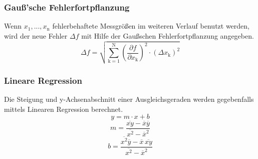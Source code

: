 \subsubsection{Gauß'sche Fehlerfortpflanzung}
Wenn $x_\text{1}, ..., x_\text{n}$ fehlerbehaftete Messgrößen im weiteren Verlauf benutzt werden, wird der neue Fehler $\Delta f$ mit Hilfe der Gaußschen Fehlerfortpflanzung angegeben.
\begin{equation}
	\Delta f = \sqrt{\sum_{\text{k}=1}^\text{N} \left( \frac{ \partial f}{\partial x_\text{k}} \right) ^2 \cdot (\Delta x_\text{k})^2}
\end{equation}

\subsubsection{Lineare Regression}
Die Steigung und y-Achsenabschnitt einer Ausgleichsgeraden werden gegebenfalls mittels Linearen Regression berechnet.
\begin{equation}
	y = m \cdot x + b
\end{equation}
\begin{equation}
	m = \frac{ \overline{xy} - \overline{x} \overline{y} } {\overline{x^2} - \overline{x}^2}
\end{equation}
\begin{equation}
	b = \frac{ \overline{x^2}\overline{y} - \overline{x} \, \overline{xy}} { \overline{x^2} - \overline{x}^2}
\end{equation}
\newpage
